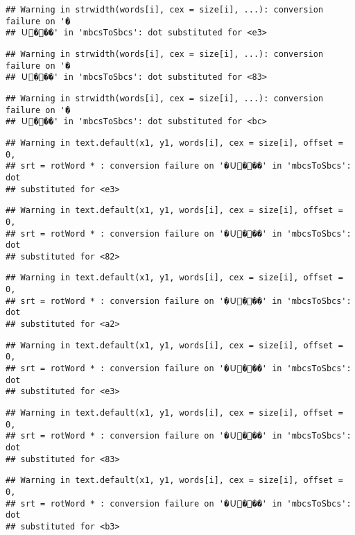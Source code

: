 \documentclass[]{article}
\begin{document}
\begin{verbatim}
## Warning in strwidth(words[i], cex = size[i], ...): conversion failure on '�
## Ｕ���' in 'mbcsToSbcs': dot substituted for <e3>
\end{verbatim}

\begin{verbatim}
## Warning in strwidth(words[i], cex = size[i], ...): conversion failure on '�
## Ｕ���' in 'mbcsToSbcs': dot substituted for <83>
\end{verbatim}

\begin{verbatim}
## Warning in strwidth(words[i], cex = size[i], ...): conversion failure on '�
## Ｕ���' in 'mbcsToSbcs': dot substituted for <bc>
\end{verbatim}

\begin{verbatim}
## Warning in text.default(x1, y1, words[i], cex = size[i], offset = 0,
## srt = rotWord * : conversion failure on '�Ｕ���' in 'mbcsToSbcs': dot
## substituted for <e3>
\end{verbatim}

\begin{verbatim}
## Warning in text.default(x1, y1, words[i], cex = size[i], offset = 0,
## srt = rotWord * : conversion failure on '�Ｕ���' in 'mbcsToSbcs': dot
## substituted for <82>
\end{verbatim}

\begin{verbatim}
## Warning in text.default(x1, y1, words[i], cex = size[i], offset = 0,
## srt = rotWord * : conversion failure on '�Ｕ���' in 'mbcsToSbcs': dot
## substituted for <a2>
\end{verbatim}

\begin{verbatim}
## Warning in text.default(x1, y1, words[i], cex = size[i], offset = 0,
## srt = rotWord * : conversion failure on '�Ｕ���' in 'mbcsToSbcs': dot
## substituted for <e3>
\end{verbatim}

\begin{verbatim}
## Warning in text.default(x1, y1, words[i], cex = size[i], offset = 0,
## srt = rotWord * : conversion failure on '�Ｕ���' in 'mbcsToSbcs': dot
## substituted for <83>
\end{verbatim}

\begin{verbatim}
## Warning in text.default(x1, y1, words[i], cex = size[i], offset = 0,
## srt = rotWord * : conversion failure on '�Ｕ���' in 'mbcsToSbcs': dot
## substituted for <b3>
\end{verbatim}
\end{document}
